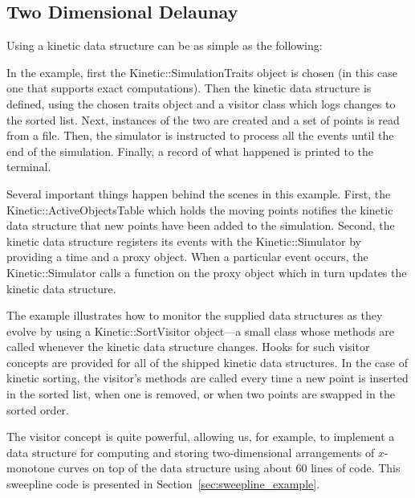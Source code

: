 \subsection{Two Dimensional Delaunay}
\label{sec:sort_example}

Using a kinetic data structure can be as simple as the following:
\label{fig:sort_program}

In the example, first the Kinetic::SimulationTraits object is chosen
(in this case one that supports exact computations). Then the kinetic
data structure is defined, using the chosen traits object and a
visitor class which logs changes to the sorted list.  Next, instances
of the two are created and a set of points is read from a file. Then,
the simulator is instructed to process all the events until the end of
the simulation.  Finally, a record of what happened is printed to the
terminal.

Several important things happen behind the scenes in this example.
First, the Kinetic::ActiveObjectsTable which holds the moving points
notifies the kinetic data structure that new points have been added to
the simulation. Second, the  kinetic data structure
registers its events with the Kinetic::Simulator by providing a time
and a proxy object. When a particular event occurs, the
Kinetic::Simulator calls a function on the proxy object which in turn
updates the kinetic data structure.

The example illustrates how to monitor the supplied data structures as
they evolve by using a Kinetic::SortVisitor object---a small class whose
methods are called whenever the kinetic data structure changes. Hooks
for such visitor concepts are provided for all of the shipped kinetic
data structures. In the case of kinetic sorting, the visitor's
methods are called every time a new point is inserted in the sorted
list, when one is removed, or when two points are swapped in the
sorted order. 


The visitor concept is quite powerful, allowing us, for example, to
implement a data structure for computing and storing two-dimensional
arrangements of $x$-monotone curves on top of the
 data structure using about 60
lines of code. This sweepline code is presented in
Section~\ref{sec:sweepline_example}.
